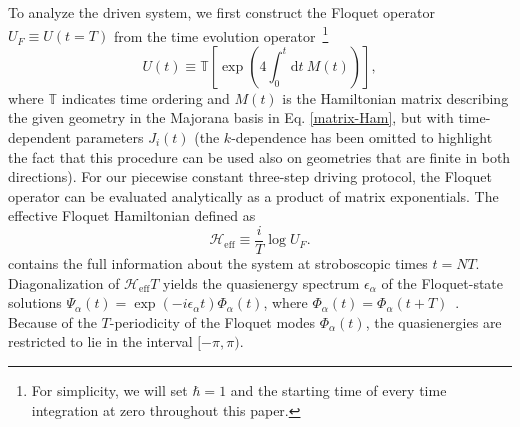 \documentclass[aps,prb,twocolumn,superscriptaddress,groupedaddress]{revtex4}
\begin{document}
To analyze the driven system, we first construct the Floquet operator~\cite{Thakurathi:2014} $U_F \equiv U(t=T)$ from the time evolution operator~\footnote{For simplicity, we will set $\hbar=1$ and the starting time of every time integration at zero throughout this paper.}
%
\begin{equation}
U(t) \equiv \mathbb{T} \left[ \exp \left( 4 \int_0^t \mathrm{d}t \: M(t) \right) \right],
\end{equation}
%
where $\mathbb{T}$ indicates time ordering and $M(t)$ is the Hamiltonian matrix describing the given geometry in the Majorana basis in Eq. \eqref{matrix-Ham}, but with time-dependent parameters $J_i(t)$ (the $k$-dependence has been omitted to highlight the fact that this procedure can be used also on geometries that are finite in both directions).
For our piecewise constant three-step driving protocol, the Floquet operator can be evaluated analytically as a product of matrix exponentials.
The effective Floquet Hamiltonian defined as ~\cite{}
%
\begin{equation}
\mathcal{H}_{\text{eff}} \equiv \frac{i}{T} \log U_F.
\label{eff-Floquet-Ham}
\end{equation}
%
 contains the full information about the system at stroboscopic times $t=N T$.
Diagonalization of $\mathcal{H}_{\text{eff}} T$ yields the  quasienergy spectrum $\epsilon_{\alpha}$ of the Floquet-state solutions $\Psi_{\alpha}(t) = \exp(-i\epsilon_{\alpha} t) \Phi_{\alpha}(t)$, where $\Phi_{\alpha}(t) = \Phi_{\alpha}( t+ T)$~\citep{Dittrich:1998}. 
Because of the $T$-periodicity of the Floquet modes $\Phi_{\alpha}(t)$, the quasienergies are restricted to lie in the interval $[-\pi, \pi)$.
\end{document}

